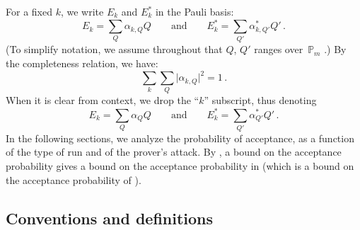 \documentclass{toc}
\providecommand{\abs}[1]{\lvert#1\rvert}
\begin{document}
For a fixed $k$, we write  $E_k$ and $E_k^*$ in the Pauli basis:
%
\begin{equation}
  E_k = \sum_Q \alpha_{k,Q} Q\qquad\text{and}\qquad E_k^* = \sum_{Q'} \alpha_{k,Q'}^* Q'\,.
\end{equation}
%
%
%
(To 
simplify notation, we assume throughout that $Q$, $Q'$ ranges
over~$\mathbb{P}_{m}$  
%
.)
By the completeness relation, we have:
\begin{equation}
  \sum_k\sum_Q\abs{\alpha_{k,Q}}^2 =1\,.
\end{equation}
When it is clear from context, we drop the ``$k$'' subscript, thus
denoting
\begin{equation}
  E_k = \sum_Q \alpha_{Q} Q\qquad\text{and}\qquad E_k^* = \sum_{Q'} \alpha_{Q'}^* Q'\,.
\end{equation}
In the following sections, we analyze the probability of acceptance,
as a function of the type of run and of the prover's attack. By
, a bound on the acceptance
probability gives a bound on the acceptance probability in
 (which
is a bound on the acceptance probability of ).

\subsection{Conventions and definitions}
\label{sec:conventions}
\end{document}
